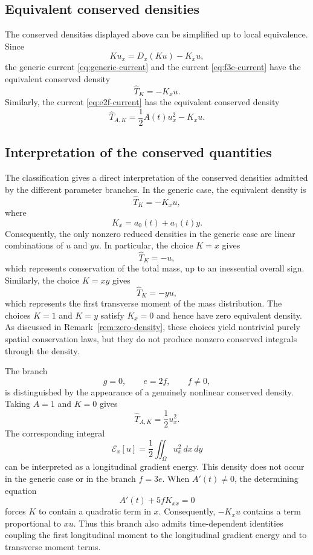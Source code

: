 \documentclass[11pt]{article}
\numberwithin{equation}{section}
\theoremstyle{definition}
\theoremstyle{remark}
\begin{document}
\subsection{Equivalent conserved densities}

The conserved densities displayed above can be simplified up to local
equivalence. Since
\begin{equation*}
K u_x=D_x(Ku)-K_xu,
\end{equation*}
the generic current \eqref{eq:generic-current} and the current
\eqref{eq:f3e-current} have the equivalent conserved density
\begin{equation}
\widehat{T}_K=-K_xu.
\label{eq:equivalent-density-K}
\end{equation}
Similarly, the current \eqref{eq:e2f-current} has the equivalent
conserved density
\begin{equation}
\widehat{T}_{A,K}
=
\frac12A(t)u_x^2-K_xu.
\label{eq:equivalent-density-AK}
\end{equation}

\subsection{Interpretation of the conserved quantities}
\label{subsec:interpretation}

The classification gives a direct interpretation of the conserved
densities admitted by the different parameter branches. In the
generic case, the equivalent density is
\[
\widehat{T}_K=-K_xu,
\]
where
\[
K_x=a_0(t)+a_1(t)y.
\]
Consequently, the only nonzero reduced densities in the generic case
are linear combinations of $u$ and $yu$. In particular, the choice
$K=x$ gives
\[
\widehat{T}_K=-u,
\]
which represents conservation of the total mass, up to an
inessential overall sign. Similarly, the choice $K=xy$ gives
\[
\widehat{T}_K=-yu,
\]
which represents the first transverse moment of the mass
distribution. The choices $K=1$ and $K=y$ satisfy $K_x=0$ and hence
have zero equivalent density. As discussed in
Remark~\ref{rem:zero-density}, these choices yield nontrivial purely
spatial conservation laws, but they do not produce nonzero conserved
integrals through the density.

The branch
\[
g=0,
\qquad
e=2f,
\qquad
f\neq0,
\]
is distinguished by the appearance of a genuinely nonlinear
conserved density. Taking $A=1$ and $K=0$ gives
\[
\widehat{T}_{A,K}=\frac12u_x^2.
\]
The corresponding integral
\[
\mathcal{E}_x[u]
=
\frac12\iint_{\Omega}u_x^2\,dx\,dy
\]
can be interpreted as a longitudinal gradient energy. This density
does not occur in the generic case or in the branch $f=3e$. When
$A'(t)\neq0$, the determining equation
\[
A'(t)+5fK_{xx}=0
\]
forces $K$ to contain a quadratic term in $x$. Consequently,
$-K_xu$ contains a term proportional to $xu$. Thus this branch also
admits time-dependent identities coupling the first longitudinal
moment to the longitudinal gradient energy and to transverse
moment terms.
\end{document}
